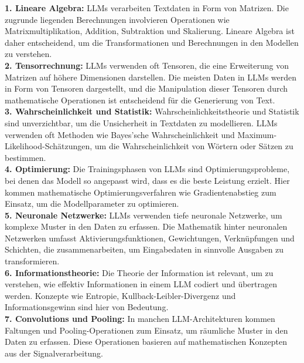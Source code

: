\documentclass[12pt]{article}
\begin{document}
\textbf{1. Lineare Algebra:} LLMs verarbeiten Textdaten in Form von Matrizen. Die zugrunde liegenden Berechnungen involvieren Operationen wie Matrixmultiplikation, Addition, Subtraktion und Skalierung. Lineare Algebra ist daher entscheidend, um die Transformationen und Berechnungen in den Modellen zu verstehen.\\

\textbf{2. Tensorrechnung:} LLMs verwenden oft Tensoren, die eine Erweiterung von Matrizen auf höhere Dimensionen darstellen. Die meisten Daten in LLMs werden in Form von Tensoren dargestellt, und die Manipulation dieser Tensoren durch mathematische Operationen ist entscheidend für die Generierung von Text.\\

\textbf{3. Wahrscheinlichkeit und Statistik:} Wahrscheinlichkeitstheorie und Statistik sind unverzichtbar, um die Unsicherheit in Textdaten zu modellieren. LLMs verwenden oft Methoden wie Bayes'sche Wahrscheinlichkeit und Maximum-Likelihood-Schätzungen, um die Wahrscheinlichkeit von Wörtern oder Sätzen zu bestimmen.\\

\textbf{4. Optimierung:} Die Trainingsphasen von LLMs sind Optimierungsprobleme, bei denen das Modell so angepasst wird, dass es die beste Leistung erzielt. Hier kommen mathematische Optimierungsverfahren wie Gradientenabstieg zum Einsatz, um die Modellparameter zu optimieren.\\

\textbf{5. Neuronale Netzwerke:} LLMs verwenden tiefe neuronale Netzwerke, um komplexe Muster in den Daten zu erfassen. Die Mathematik hinter neuronalen Netzwerken umfasst Aktivierungsfunktionen, Gewichtungen, Verknüpfungen und Schichten, die zusammenarbeiten, um Eingabedaten in sinnvolle Ausgaben zu transformieren.\\

\textbf{6. Informationstheorie:} Die Theorie der Information ist relevant, um zu verstehen, wie effektiv Informationen in einem LLM codiert und übertragen werden. Konzepte wie Entropie, Kullback-Leibler-Divergenz und Informationsgewinn sind hier von Bedeutung.\\

\textbf{7. Convolutions und Pooling:} In manchen LLM-Architekturen kommen Faltungen und Pooling-Operationen zum Einsatz, um räumliche Muster in den Daten zu erfassen. Diese Operationen basieren auf mathematischen Konzepten aus der Signalverarbeitung.\\
\end{document}
